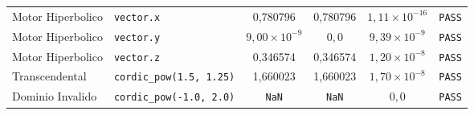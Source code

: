 \begin{table}[htbp]
{\begin{tabular}{llcccc}
Motor Hiperbolico & \texttt{vector.x} & 0,780796 & 0,780796 & $1,11 \times 10^{-16}$ & \texttt{PASS} \\
Motor Hiperbolico & \texttt{vector.y} & $9,00 \times 10^{-9}$ & $0{,}0$ & $9,39 \times 10^{-9}$ & \texttt{PASS} \\
Motor Hiperbolico & \texttt{vector.z} & 0,346574 & 0,346574 & $1,20 \times 10^{-8}$ & \texttt{PASS} \\
Transcendental & \texttt{cordic\_pow(1.5, 1.25)} & 1,660023 & 1,660023 & $1,70 \times 10^{-8}$ & \texttt{PASS} \\
Dominio Invalido & \texttt{cordic\_pow(-1.0, 2.0)} & \texttt{NaN} & \texttt{NaN} & $0{,}0$ & \texttt{PASS} \\
\hline
\end{tabular}%
}
\end{table}
